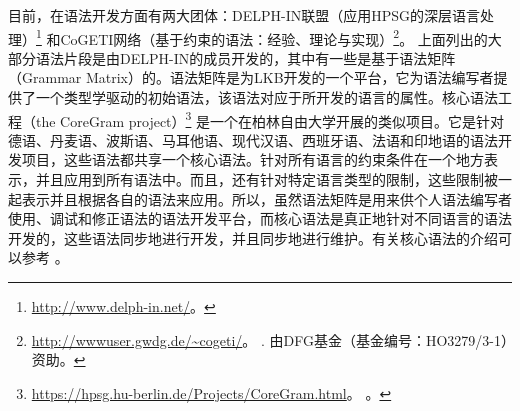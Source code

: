 目前，在语法开发方面有两大团体：DELPH-IN联盟（应用HPSG的深层语言处理）\footnote{%
  \url{http://www.delph-in.net/}。 
} 和CoGETI网络（基于约束的语法：经验、理论与实现）\footnote{%
\url{http://wwwuser.gwdg.de/~cogeti/}。 . 由DFG基金（基金编号：HO3279/3-1）资助。}。
上面列出的大部分语法片段是由DELPH-IN的成员开发的，其中有一些是基于语法矩阵（Grammar Matrix）的。语法矩阵是为LKB开发的一个平台，它为语法编写者提供了一个类型学驱动的初始语法，该语法对应于所开发的语言的属性\citep*{BFO2002a-u}。核心语法工程（the CoreGram project）\footnote{\url{https://hpsg.hu-berlin.de/Projects/CoreGram.html}。 \mytodayc。
}
是一个在柏林自由大学开展的类似项目。它是针对德语、丹麦语、波斯语、马耳他语、现代汉语、西班牙语、法语和印地语的语法开发项目，这些语法都共享一个核心语法。针对所有语言的约束条件在一个地方表示，并且应用到所有语法中。而且，还有针对特定语言类型的限制，这些限制被一起表示并且根据各自的语法来应用。所以，虽然语法矩阵是用来供个人语法编写者使用、调试和修正语法的语法开发平台，而核心语法是真正地针对不同语言的语法开发的，这些语法同步地进行开发，并且同步地进行维护。有关核心语法的介绍可以参考 。

